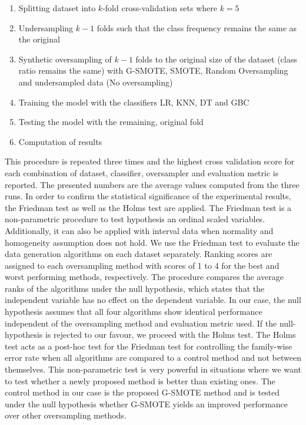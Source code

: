 \documentclass[parskip=full]{scrartcl}
\begin{document}
\begin{enumerate}
	\item 
	Splitting dataset into $\mathit{k}$-fold cross-validation sets where 
	$\mathit{k = 5}$
	\item 
	Undersampling $\mathit{k - 1}$ folds such that the class frequency remains 
	the same as the original
	\item 
	Synthetic oversampling of $\mathit{k - 1}$ folds to the original size of 
	the dataset (class ratio remains the same) with G-SMOTE, SMOTE, Random 
	Oversampling and undersampled data (No oversampling)
	\item 
	Training the model with the classifiers LR, KNN, DT and GBC
	\item 
	Testing the model with the remaining, original fold
	\item 
	Computation of results
\end{enumerate}	

This procedure is repeated three times and the highest cross validation score 
for each combination of dataset, classifier, oversampler and evaluation metric 
is reported. The presented numbers are the average values computed from the 
three runs. In order to confirm the statistical significance of the 
experimental results, the Friedman test \cite{Sheldon.1996} as well as the 
Holms test \cite{JanezDemsar.2006} are applied. The Friedman test is a 
non-parametric procedure to test hypothesis an ordinal scaled variables. 
Additionally, it can also be applied with interval data when normality and 
homogeneity assumption does not hold. We use the Friedman test to evaluate the 
data generation algorithms on each dataset separately. Ranking scores are 
assigned to each oversampling method with scores of 1 to 4 for the best and 
worst performing methods, respectively. The procedure compares the average 
ranks of the algorithms under the null hypothesis, which states that the 
independent variable has no effect on the dependent variable. In our case, the 
null hypothesis assumes that all four algorithms show identical performance 
independent of the oversampling method and evaluation metric used. If the 
null-hypothesis is rejected to our favour, we proceed with the Holms test. The 
Holms test acts as a post-hoc test for the Friedman test for controlling the 
family-wise error rate when all algorithms are compared to a control method and 
not between themselves. This non-parametric test is very powerful in situations 
where we want to test whether a newly proposed method is better than existing 
ones. The control method in our case is the proposed G-SMOTE method and is 
tested under the null hypothesis whether G-SMOTE yields an improved performance 
over other oversampling methods.
\end{document}
